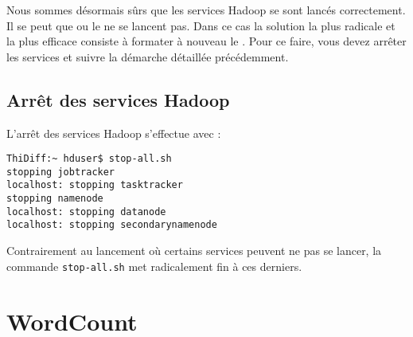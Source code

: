 \par Nous sommes désormais sûrs que les services Hadoop se sont lancés correctement. Il se peut que  ou le  ne se lancent pas. Dans ce cas la solution la plus radicale et la plus efficace consiste à formater à nouveau le . Pour ce faire, vous devez arrêter les services et suivre la démarche détaillée précédemment.

\subsection{Arrêt des services Hadoop}
\label{sec:arret-service-hadoop}

\par L'arrêt des services Hadoop s'effectue avec :

\begin{verbatim}
ThiDiff:~ hduser$ stop-all.sh
stopping jobtracker
localhost: stopping tasktracker
stopping namenode
localhost: stopping datanode
localhost: stopping secondarynamenode
\end{verbatim}

\par Contrairement au lancement où certains services peuvent ne pas se lancer, la commande \texttt{stop-all.sh} met radicalement fin à ces derniers.

\section{WordCount}
\label{sec:ex-wordcount}

